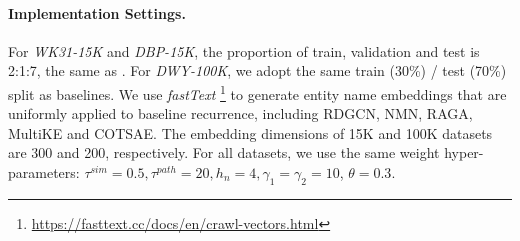 \documentclass{article}
\begin{document}
\paragraph{Implementation Settings.}
For \textit{WK31-15K} and \textit{DBP-15K}, the proportion of train, validation and test is 2:1:7, the same as \cite{sun_benchmarking_2020}.
For \textit{DWY-100K}, we adopt the same train (30\%) / test (70\%) split as baselines. 
We use \textit{fastText} \footnote{\url{https://fasttext.cc/docs/en/crawl-vectors.html}} to generate entity name embeddings that are uniformly applied to baseline recurrence, including RDGCN, NMN, RAGA, MultiKE and COTSAE.
The embedding dimensions of 15K and 100K datasets are 300 and 200, respectively.
For all datasets, we use the same weight hyper-parameters: $\tau^{sim}=0.5, \tau^{path}=20, h_n \!=\! 4, \gamma_{1}\!=\! \gamma_{2}\!=\!10$, $\theta = 0.3$.


\end{document}
